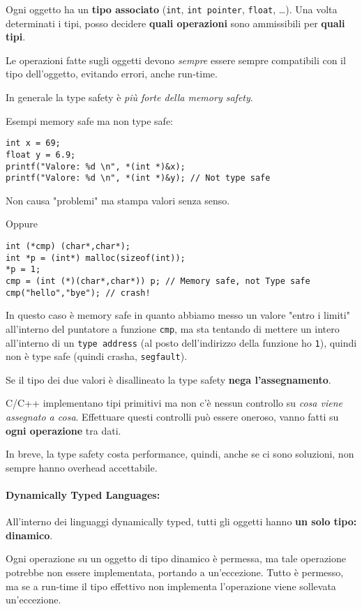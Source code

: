 Ogni oggetto ha un \textbf{tipo associato} (\texttt{int}, \texttt{int pointer}, \texttt{float}, \dots). Una volta determinati i tipi, posso decidere \textbf{quali operazioni} sono ammissibili per \textbf{quali tipi}. 

Le operazioni fatte sugli oggetti devono \textit{sempre} essere sempre compatibili con il tipo dell'oggetto, evitando errori, anche run-time.

In generale la type safety è \textit{più forte della memory safety}. 

Esempi memory safe ma non type safe:
\begin{verbatim}
int x = 69;
float y = 6.9;
printf("Valore: %d \n", *(int *)&x);
printf("Valore: %d \n", *(int *)&y); // Not type safe
\end{verbatim}
Non causa "problemi" ma stampa valori senza senso.

Oppure
\begin{verbatim}
int (*cmp) (char*,char*);
int *p = (int*) malloc(sizeof(int));
*p = 1;
cmp = (int (*)(char*,char*)) p; // Memory safe, not Type safe
cmp("hello","bye"); // crash!
\end{verbatim}

In questo caso è memory safe in quanto abbiamo messo un valore "entro i limiti" all'interno del puntatore a funzione \texttt{cmp}, ma sta tentando di mettere un intero all'interno di un \texttt{type address} (al posto dell'indirizzo della funzione ho \texttt{1}), quindi non è type safe (quindi crasha, \texttt{segfault}). 

Se il tipo dei due valori è disallineato la type safety \textbf{nega l'assegnamento}.

C/C++ implementano tipi primitivi ma non c'è nessun controllo su \textit{cosa viene assegnato a cosa}. Effettuare questi controlli può essere oneroso, vanno fatti su \textbf{ogni operazione} tra dati. 

In breve, la type safety costa performance, quindi, anche se ci sono soluzioni, non sempre hanno overhead accettabile. 

\paragraph{Dynamically Typed Languages:} All'interno dei linguaggi dynamically typed, tutti gli oggetti hanno \textbf{un solo tipo: dinamico}. 

Ogni operazione su un oggetto di tipo dinamico è permessa, ma tale operazione potrebbe non essere implementata, portando a un'eccezione. Tutto è permesso, ma se a run-time il tipo effettivo non implementa l'operazione viene sollevata un'eccezione.

